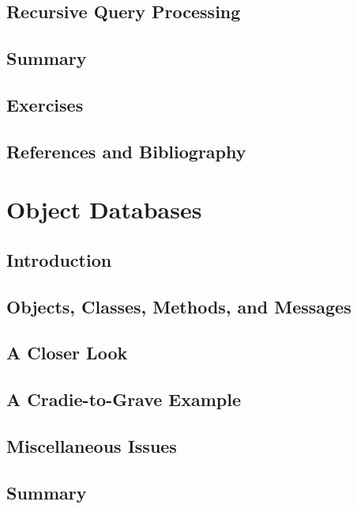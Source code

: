 \documentclass{book}
\begin{document}
\section{Recursive Query Processing}

\section{Summary}

\section{Exercises}

\section{References and Bibliography}












\chapter{Object Databases}

\section{Introduction}

\section{Objects, Classes, Methods, and Messages}

\section{A Closer Look}

\section{A Cradie-to-Grave Example}

\section{Miscellaneous Issues}

\section{Summary}
\end{document}

